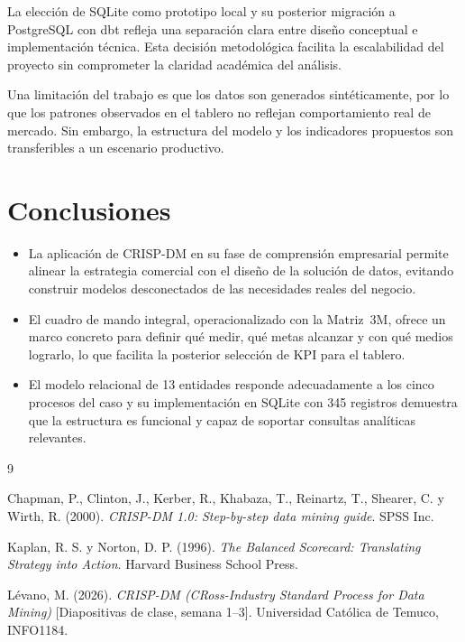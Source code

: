 \documentclass[10pt,a4paper]{article}
\begin{document}
La elecci\'on de SQLite como prototipo local y su posterior migraci\'on a PostgreSQL con dbt refleja una separaci\'on clara entre dise\~no conceptual e implementaci\'on t\'ecnica. Esta decisi\'on metodol\'ogica facilita la escalabilidad del proyecto sin comprometer la claridad acad\'emica del an\'alisis.

Una limitaci\'on del trabajo es que los datos son generados sint\'eticamente, por lo que los patrones observados en el tablero no reflejan comportamiento real de mercado. Sin embargo, la estructura del modelo y los indicadores propuestos son transferibles a un escenario productivo.

\section{Conclusiones}


\begin{itemize}
    \item La aplicaci\'on de CRISP-DM en su fase de comprensi\'on empresarial permite alinear la estrategia comercial con el dise\~no de la soluci\'on de datos, evitando construir modelos desconectados de las necesidades reales del negocio.

    \item El cuadro de mando integral, operacionalizado con la Matriz~3M, ofrece un marco concreto para definir qu\'e medir, qu\'e metas alcanzar y con qu\'e medios lograrlo, lo que facilita la posterior selecci\'on de KPI para el tablero.

    \item El modelo relacional de 13 entidades responde adecuadamente a los cinco procesos del caso y su implementaci\'on en SQLite con 345 registros demuestra que la estructura es funcional y capaz de soportar consultas anal\'iticas relevantes.
\end{itemize}

\begin{thebibliography}{9}

Chapman, P., Clinton, J., Kerber, R., Khabaza, T., Reinartz, T., Shearer, C. y Wirth, R. (2000). \textit{CRISP-DM 1.0: Step-by-step data mining guide}. SPSS Inc.

Kaplan, R. S. y Norton, D. P. (1996). \textit{The Balanced Scorecard: Translating Strategy into Action}. Harvard Business School Press.

L\'evano, M. (2026). \textit{CRISP-DM (CRoss-Industry Standard Process for Data Mining)} [Diapositivas de clase, semana 1--3]. Universidad Cat\'olica de Temuco, INFO1184.

\end{thebibliography}
\end{document}

